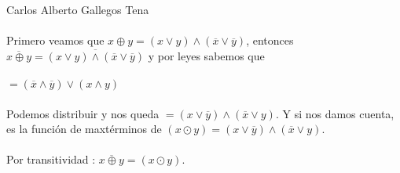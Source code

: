 \documentclass[a4paper,10pt]{article}
\title{}
\author{}
\date{}
\begin{document}
\maketitle
Carlos Alberto Gallegos Tena \\\\
Primero veamos que $x \oplus y = (x\vee y) \wedge (\overline{x} \vee \overline{y})$, entonces  $\overline{x \oplus y} = \overline{(x\vee y) \wedge (\overline{x} \vee \overline{y})}$ y por leyes sabemos que \\\\
$=(\overline{x} \wedge \overline{y}) \vee(x\wedge y) $\\\\
Podemos distribuir y nos queda $ = (x \vee \overline{y})\wedge (\overline{x} \vee y)$. Y si nos damos cuenta, es la función de maxtérminos de $(x \odot y) = (x \vee \overline{y})\wedge (\overline{x} \vee y)$.\\\\
Por transitividad : $\overline{x \oplus y} = (x \odot y)$.\\
\end{document}
